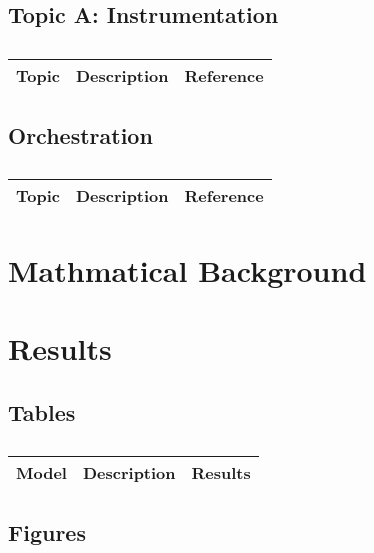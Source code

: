 \subsection{Topic A: Instrumentation}

\centering	
\begin{table}[H]\tiny
	\caption{}	
	\begin{tabular}{r|p{4cm}|l}
		\hline	
		Topic & Description & Reference \\
		\hline 
		\hline 
	\end{tabular}
\end{table}

\subsection{Orchestration}

\centering	
\begin{table}[H]\tiny
	\caption{}	
	\begin{tabular}{r|p{4cm}|l}
		\hline	
		Topic & Description & Reference \\
		\hline 
		\hline 
	\end{tabular}
\end{table}

\section{Mathmatical Background}

\section{Results}


\subsection{Tables}

\centering	
\begin{table}[H]\tiny
	\caption{}	
	\begin{tabular}{r|p{4cm}|l}
		\hline	
		Model & Description & Results \\
		\hline 
		\hline 
	\end{tabular}
\end{table}

\subsection{Figures}

